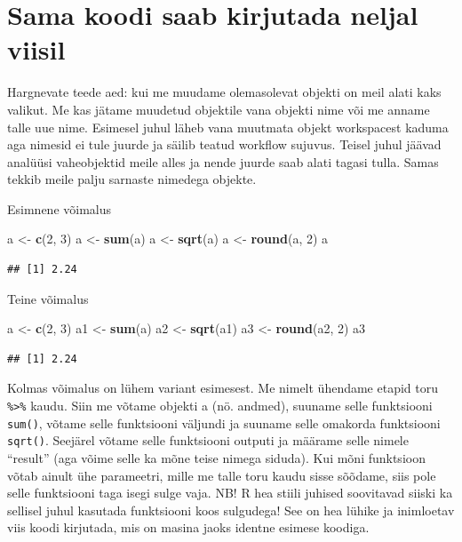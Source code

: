\documentclass[]{book}
\newenvironment{Shaded}{\begin{snugshade}}{\end{snugshade}}
\newcommand{\KeywordTok}[1]{\textcolor[rgb]{0.13,0.29,0.53}{\textbf{#1}}}
\newcommand{\DecValTok}[1]{\textcolor[rgb]{0.00,0.00,0.81}{#1}}
\newcommand{\StringTok}[1]{\textcolor[rgb]{0.31,0.60,0.02}{#1}}
\newcommand{\NormalTok}[1]{#1}
\begin{document}
\section{Sama koodi saab kirjutada neljal
viisil}\label{sama-koodi-saab-kirjutada-neljal-viisil}

Hargnevate teede aed: kui me muudame olemasolevat objekti on meil alati
kaks valikut. Me kas jätame muudetud objektile vana objekti nime või me
anname talle uue nime. Esimesel juhul läheb vana muutmata objekt
workspacest kaduma aga nimesid ei tule juurde ja säilib teatud workflow
sujuvus. Teisel juhul jäävad analüüsi vaheobjektid meile alles ja nende
juurde saab alati tagasi tulla. Samas tekkib meile palju sarnaste
nimedega objekte.

Esimnene võimalus

\begin{Shaded}
\begin{Highlighting}[]
\NormalTok{a <-}\StringTok{ }\KeywordTok{c}\NormalTok{(}\DecValTok{2}\NormalTok{, }\DecValTok{3}\NormalTok{)}
\NormalTok{a <-}\StringTok{ }\KeywordTok{sum}\NormalTok{(a)}
\NormalTok{a <-}\StringTok{ }\KeywordTok{sqrt}\NormalTok{(a)}
\NormalTok{a <-}\StringTok{ }\KeywordTok{round}\NormalTok{(a, }\DecValTok{2}\NormalTok{)}
\NormalTok{a}
\end{Highlighting}
\end{Shaded}

\begin{verbatim}
## [1] 2.24
\end{verbatim}

Teine võimalus

\begin{Shaded}
\begin{Highlighting}[]
\NormalTok{a <-}\StringTok{ }\KeywordTok{c}\NormalTok{(}\DecValTok{2}\NormalTok{, }\DecValTok{3}\NormalTok{)}
\NormalTok{a1 <-}\StringTok{ }\KeywordTok{sum}\NormalTok{(a)}
\NormalTok{a2 <-}\StringTok{ }\KeywordTok{sqrt}\NormalTok{(a1)}
\NormalTok{a3 <-}\StringTok{ }\KeywordTok{round}\NormalTok{(a2, }\DecValTok{2}\NormalTok{)}
\NormalTok{a3}
\end{Highlighting}
\end{Shaded}

\begin{verbatim}
## [1] 2.24
\end{verbatim}

Kolmas võimalus on lühem variant esimesest. Me nimelt ühendame etapid
toru \texttt{\%\textgreater{}\%} kaudu. Siin me võtame objekti a (nö.
andmed), suuname selle funktsiooni \texttt{sum()}, võtame selle
funktsiooni väljundi ja suuname selle omakorda funktsiooni
\texttt{sqrt()}. Seejärel võtame selle funktsiooni outputi ja määrame
selle nimele ``result'' (aga võime selle ka mõne teise nimega siduda).
Kui mõni funktsioon võtab ainult ühe parameetri, mille me talle toru
kaudu sisse sõõdame, siis pole selle funktsiooni taga isegi sulge vaja.
NB! R hea stiili juhised soovitavad siiski ka sellisel juhul kasutada
funktsiooni koos sulgudega! See on hea lühike ja inimloetav viis koodi
kirjutada, mis on masina jaoks identne esimese koodiga.
\end{document}
